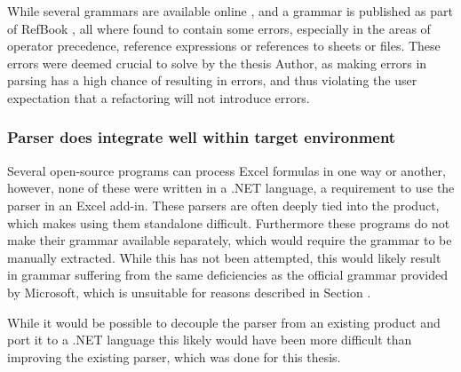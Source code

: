 While several grammars are available online \cite{ewbi,fishbrain}, and a grammar is published as part of RefBook \cite{badame2012refactoring}, all where found to contain some errors, especially in the areas of operator precedence, reference expressions or references to sheets or files.
These errors were deemed crucial to solve by the thesis Author, as making errors in parsing has a high chance of resulting in errors, and thus violating the user expectation that a refactoring will not introduce errors.

\subsubsection{Parser does integrate well within target environment}

Several open-source programs \cite{libreoffice,calligra} can process Excel formulas in one way or another, however, none of these were written in a .NET language, a requirement to use the parser in an Excel add-in.
These parsers are often deeply tied into the product, which makes using them standalone difficult.
Furthermore these programs do not make their grammar available separately, which would require the grammar to be manually extracted.
While this has not been attempted, this would likely result in grammar suffering from the same deficiencies as the official grammar provided by Microsoft, which is unsuitable for reasons described in Section \label{sec:motivation}.

While it would be possible to decouple the parser from an existing product and port it to a .NET language this likely would have been more difficult than improving the existing parser, which was done for this thesis.